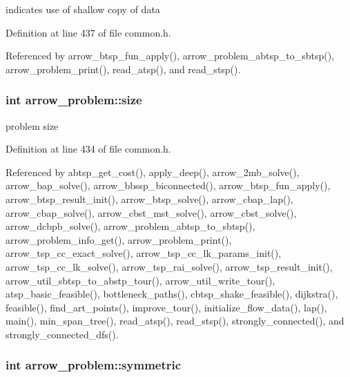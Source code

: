 indicates use of shallow copy of data 

Definition at line 437 of file common.h.

Referenced by arrow\_\-btsp\_\-fun\_\-apply(), arrow\_\-problem\_\-abtsp\_\-to\_\-sbtsp(), arrow\_\-problem\_\-print(), read\_\-atsp(), and read\_\-stsp().\hypertarget{structarrow__problem_de8573ddc391d06b08b65923fca693ec}{
\subsubsection[{size}]{\setlength{\rightskip}{0pt plus 5cm}int {\bf arrow\_\-problem::size}}}
\label{structarrow__problem_de8573ddc391d06b08b65923fca693ec}


problem size 

Definition at line 434 of file common.h.

Referenced by abtsp\_\-get\_\-cost(), apply\_\-deep(), arrow\_\-2mb\_\-solve(), arrow\_\-bap\_\-solve(), arrow\_\-bbssp\_\-biconnected(), arrow\_\-btsp\_\-fun\_\-apply(), arrow\_\-btsp\_\-result\_\-init(), arrow\_\-btsp\_\-solve(), arrow\_\-cbap\_\-lap(), arrow\_\-cbap\_\-solve(), arrow\_\-cbst\_\-mst\_\-solve(), arrow\_\-cbst\_\-solve(), arrow\_\-dcbpb\_\-solve(), arrow\_\-problem\_\-abtsp\_\-to\_\-sbtsp(), arrow\_\-problem\_\-info\_\-get(), arrow\_\-problem\_\-print(), arrow\_\-tsp\_\-cc\_\-exact\_\-solve(), arrow\_\-tsp\_\-cc\_\-lk\_\-params\_\-init(), arrow\_\-tsp\_\-cc\_\-lk\_\-solve(), arrow\_\-tsp\_\-rai\_\-solve(), arrow\_\-tsp\_\-result\_\-init(), arrow\_\-util\_\-sbtsp\_\-to\_\-abstp\_\-tour(), arrow\_\-util\_\-write\_\-tour(), atsp\_\-basic\_\-feasible(), bottleneck\_\-paths(), cbtsp\_\-shake\_\-feasible(), dijkstra(), feasible(), find\_\-art\_\-points(), improve\_\-tour(), initialize\_\-flow\_\-data(), lap(), main(), min\_\-span\_\-tree(), read\_\-atsp(), read\_\-stsp(), strongly\_\-connected(), and strongly\_\-connected\_\-dfs().\hypertarget{structarrow__problem_168ab92e9d7a873740a2550f4d3510d9}{
\subsubsection[{symmetric}]{\setlength{\rightskip}{0pt plus 5cm}int {\bf arrow\_\-problem::symmetric}}}
\label{structarrow__problem_168ab92e9d7a873740a2550f4d3510d9}


